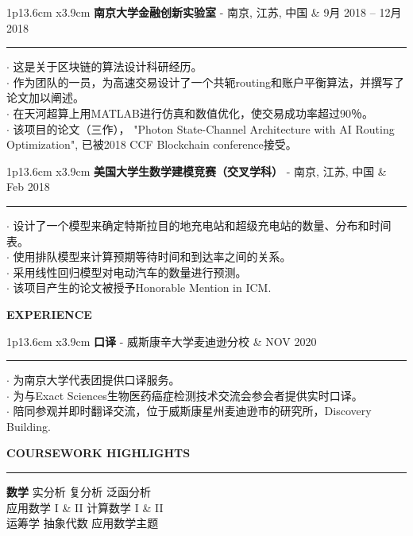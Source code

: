 \documentclass[UTF8,A4]{ctexart}
\newcommand{\cvsection}[1]
{
	\begin{center}
		\large\textcolor{sectcol}{\textbf{#1}}
	\end{center}
}
\newcommand{\cvevent}[3]
{

\begin{tabular*}{1\textwidth}{p{13.6cm}  x{3.9cm}}
	\textbf{#2} - \textcolor{bgcol}{#3} &   \vspace{2.5pt}\textcolor{sectcol}{#1}
\end{tabular*}

\vspace{-8pt}
\textcolor{softcol}{\hrule}
\vspace{6pt}


}
\begin{document}
\cvevent{9月 2018 – 12月 2018}
        {南京大学金融创新实验室}
        {南京, 江苏, 中国}

        $\cdot$ 这是关于区块链的算法设计科研经历。\\
        $\cdot$ 作为团队的一员，为高速交易设计了一个共轭routing和账户平衡算法，并撰写了论文加以阐述。\\
        $\cdot$ 在天河超算上用MATLAB进行仿真和数值优化，使交易成功率超过90％。\\
        $\cdot$ 该项目的论文（三作）， 
                "Photon State-Channel Architecture with AI Routing Optimization", 
                已被2018 CCF Blockchain conference接受。\\

\cvevent{Feb 2018}
        {美国大学生数学建模竞赛（交叉学科）}
        {南京, 江苏, 中国}

        $\cdot$ 设计了一个模型来确定特斯拉目的地充电站和超级充电站的数量、分布和时间表。\\
        $\cdot$ 使用排队模型来计算预期等待时间和到达率之间的关系。\\
        $\cdot$ 采用线性回归模型对电动汽车的数量进行预测。\\
        $\cdot$ 该项目产生的论文被授予Honorable Mention in ICM.\\



\cvsection{EXPERIENCE}
\cvevent{NOV 2020}
        {口译}
        {威斯康辛大学麦迪逊分校}

        $\cdot$ 为南京大学代表团提供口译服务。\\
        $\cdot$ 为与Exact Sciences生物医药癌症检测技术交流会参会者提供实时口译。\\
        $\cdot$ 陪同参观并即时翻译交流，位于威斯康星州麦迪逊市的研究所，Discovery Building.\\


\newpage


\cvsection{COURSEWORK HIGHLIGHTS}
\vspace{-18pt}
\textcolor{softcol}{\hrule}
\vspace{6pt}

\textbf{数学}
实分析 \textbullet{} 复分析 \textbullet{} 泛函分析 \\
应用数学 I \& II \textbullet{} 计算数学 I \& II \\
运筹学 \textbullet{} 抽象代数 \textbullet{} 应用数学主题\\
\end{document}
